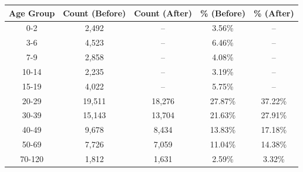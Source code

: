 \begin{tabular}{ccccc}
\toprule
Age Group & Count (Before) & Count (After) & \% (Before) & \% (After) \\
\midrule
0-2 & 2,492 & -- & 3.56\% & -- \\
3-6 & 4,523 & -- & 6.46\% & -- \\
7-9 & 2,858 & -- & 4.08\% & -- \\
10-14 & 2,235 & -- & 3.19\% & -- \\
15-19 & 4,022 & -- & 5.75\% & -- \\
20-29 & 19,511 & 18,276 & 27.87\% & 37.22\% \\
30-39 & 15,143 & 13,704 & 21.63\% & 27.91\% \\
40-49 & 9,678 & 8,434 & 13.83\% & 17.18\% \\
50-69 & 7,726 & 7,059 & 11.04\% & 14.38\% \\
70-120 & 1,812 & 1,631 & 2.59\% & 3.32\% \\
\bottomrule
\end{tabular}
